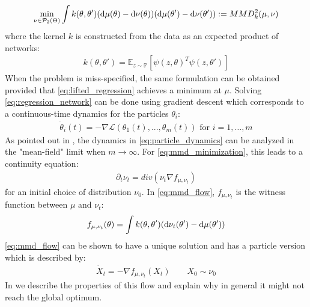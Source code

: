 \begin{align}\label{eq:mmd_minimization}
	\min_{\nu \in \mathcal{P}_2(\Theta)} \int k(\theta,\theta') (\mathop{}\!\mathrm{d}\mu(\theta) -\mathop{}\!\mathrm{d}\nu(\theta))(\mathop{}\!\mathrm{d}\mu(\theta') -\mathop{}\!\mathrm{d}\nu(\theta'))  := MMD_k^2(\mu,\nu)
\end{align} 
where the kernel $k$ is constructed from the data as an expected product of networks:
\begin{align}
	k(\theta,\theta') = \mathbb{E}_{z\sim \mathbb{P}} [\psi(z,\theta)^T\psi(z,\theta')]
\end{align}
When the problem is miss-specified, the same formulation can be obtained provided that \cref{eq:lifted_regression} achieves a minimum at $\mu$. Solving \cref{eq:regression_network} can be done using gradient descent which corresponds to a continuous-time dynamics for the particles $\theta_i$:
\begin{align}\label{eq:particle_dynamics}
	\dot{\theta}_i(t)= -\nabla \mathcal{L}(\theta_1(t),...,\theta_m(t)) \text{ for } i=1, \dots, m
\end{align}  
As pointed out in \cite{chizat2018global,Rotskoff:2019}, the dynamics in \cref{eq:particle_dynamics} can be analyzed in the "mean-field" limit when $m\rightarrow \infty$. For \cref{eq:mmd_minimization}, this leads to a continuity equation:
\begin{align}\label{eq:mmd_flow}
	\partial_t \nu_t = div(\nu_t \nabla f_{\mu,\nu_t})
\end{align}
for an initial choice of distribution $\nu_0$. In \cref{eq:mmd_flow}, $f_{\mu,\nu_t}$ is the witness function between $\mu$ and $\nu_t$:%
\[
f_{\mu,\nu_t}(\theta) =  \int k(\theta,\theta')(\mathop{}\!\mathrm{d} \nu_t(\theta')-\mathop{}\!\mathrm{d}\mu(\theta') ) 
\]
\cref{eq:mmd_flow} can be shown to have a unique solution and has a particle version which is described by:
\begin{align}\label{eq:particle_equation}
	\dot{X}_t = -\nabla f_{\mu,\nu_t}(X_t) \qquad X_0\sim \nu_0
\end{align}
In  we describe the properties of this flow and explain why in general it might not reach the global optimum.


%

